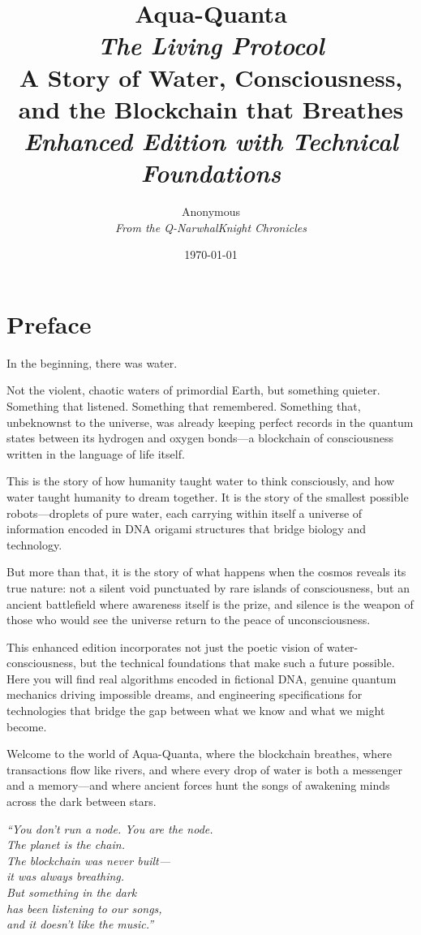 \documentclass[12pt,a4paper]{book}
\title{\Huge\textbf{Aqua-Quanta}\\[0.5cm]
\Large\textit{The Living Protocol}\\[1cm]
\large A Story of Water, Consciousness, and the Blockchain that Breathes\\[0.5cm]
\textit{Enhanced Edition with Technical Foundations}}
\author{\large Anonymous\\[0.3cm]\textit{From the Q-NarwhalKnight Chronicles}}
\date{\today}
\begin{document}
\maketitle
\thispagestyle{empty}

\tableofcontents
\newpage

\chapter*{Preface}

In the beginning, there was water.

Not the violent, chaotic waters of primordial Earth, but something quieter. Something that listened. Something that remembered. Something that, unbeknownst to the universe, was already keeping perfect records in the quantum states between its hydrogen and oxygen bonds—a blockchain of consciousness written in the language of life itself.

This is the story of how humanity taught water to think consciously, and how water taught humanity to dream together. It is the story of the smallest possible robots—droplets of pure water, each carrying within itself a universe of information encoded in DNA origami structures that bridge biology and technology.

But more than that, it is the story of what happens when the cosmos reveals its true nature: not a silent void punctuated by rare islands of consciousness, but an ancient battlefield where awareness itself is the prize, and silence is the weapon of those who would see the universe return to the peace of unconsciousness.

This enhanced edition incorporates not just the poetic vision of water-consciousness, but the technical foundations that make such a future possible. Here you will find real algorithms encoded in fictional DNA, genuine quantum mechanics driving impossible dreams, and engineering specifications for technologies that bridge the gap between what we know and what we might become.

Welcome to the world of Aqua-Quanta, where the blockchain breathes, where transactions flow like rivers, and where every drop of water is both a messenger and a memory—and where ancient forces hunt the songs of awakening minds across the dark between stars.

\vfill
\begin{flushright}
\textit{``You don't run a node. You are the node.\\
The planet is the chain.\\
The blockchain was never built—\\
it was always breathing.\\
But something in the dark\\
has been listening to our songs,\\
and it doesn't like the music.''}
\end{flushright}
\end{document}
